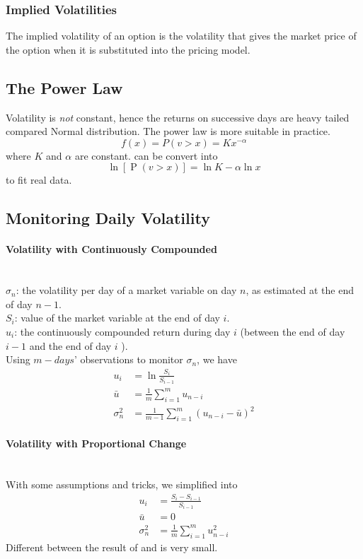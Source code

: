\subsubsection{Implied Volatilities}
The implied volatility of an option is the volatility that gives the market price of the option when it is substituted into the pricing model.

\subsection{The Power Law}
Volatility is \emph{not} constant, hence the returns on successive days are heavy tailed compared Normal distribution. The power law is more suitable in practice.
\begin{equation}
    f(x)=P(v>x)=Kx^{-\alpha} \label{eq1.1}
\end{equation}
where $K$ and $\alpha$ are constant. can be convert into
\begin{equation}
    \ln [\operatorname{P}(v>x)]=\ln K-\alpha \ln x
\end{equation} 
to fit real data.

\subsection{Monitoring Daily Volatility}
\paragraph{Volatility with Continuously Compounded}~{}\\
$\sigma_{n}$: the volatility per day of a market variable on day $n$, as estimated at the end of day $n-1$.\\
$S_{i}$: value of the market variable at the end of day $i$.\\
$u_{i}$: the continuously compounded return during day $i$ (between the end of day $i-1$ and the end of day $i$ ).\\
Using $m-days$' observations to monitor $\sigma_{n}$, we have
\begin{align}
    u_{i}&=\ln \frac{S_{i}}{S_{i-1}}\\
    \bar{u}&=\frac{1}{m} \sum_{i=1}^{m} u_{n-i}\\
    \sigma_{n}^{2}&=\frac{1}{m-1} \sum_{i=1}^{m}\left(u_{n-i}-\bar{u}\right)^{2}\label{eq1.2}
\end{align}
\paragraph{Volatility with Proportional Change}~{}\\
With some assumptions and tricks, we simplified  into 
\begin{align}
    u_{i}&=\frac{S_{i}-S_{i-1}}{S_{i-1}}\\
    \bar{u}&=0\\
    \sigma_{n}^{2}&=\frac{1}{m} \sum_{i=1}^{m} u_{n-i}^{2}\label{eq1.3}
\end{align}
Different between the result of  and  is very small.

